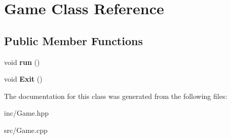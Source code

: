 \hypertarget{class_game}{\section{Game Class Reference}
\label{class_game}
}
\subsection*{Public Member Functions}
\begin{DoxyCompactItemize}
\item 
\hypertarget{class_game_a1ab78f5ed0d5ea879157357cf2fb2afa}{void {\bfseries run} ()}\label{class_game_a1ab78f5ed0d5ea879157357cf2fb2afa}

\item 
\hypertarget{class_game_ad06e374518f2c8fa38279be6712a6ea4}{void {\bfseries Exit} ()}\label{class_game_ad06e374518f2c8fa38279be6712a6ea4}

\end{DoxyCompactItemize}


The documentation for this class was generated from the following files\+:\begin{DoxyCompactItemize}
\item 
inc/Game.\+hpp\item 
src/Game.\+cpp\end{DoxyCompactItemize}
